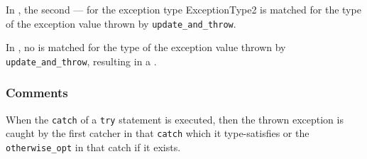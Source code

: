 

In , the second \catcherterm{} --- for the exception type ExceptionType2
is matched for the type of the exception value thrown by \verb|update_and_throw|.

In , no \catcherterm{} is matched for the type of the exception value thrown by \verb|update_and_throw|,
resulting in a \dynamicerrorterm{}.


\subsubsection{Comments}

When the \texttt{catch} of a \texttt{try} statement is executed, then the
thrown exception is caught by the first catcher in that \texttt{catch} which it
type-satisfies or the \texttt{otherwise\_opt} in that catch if it exists.
